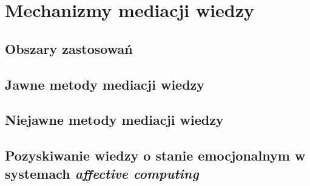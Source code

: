 \chapter{Mechanizmy mediacji wiedzy}
\label{cha:mechanizmyMediacjiWiedzy}


\section{Obszary zastosowań}
\label{sec:obszaryZastosowan}




\section{Jawne metody mediacji wiedzy}
\label{sec:jawneMetodyMediacjiWiedzy}




\section{Niejawne metody mediacji wiedzy}
\label{sec:niejawneMetodyMediacjiWiedzy}




\section{Pozyskiwanie wiedzy o stanie emocjonalnym w systemach \textit{affective computing}}
\label{sec:pozyskiwanieWiedzyOStanieEmocjonalnymWSystemachAffectiveComputing}


